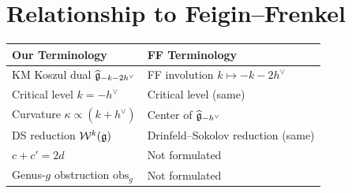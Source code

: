 \section{Relationship to Feigin--Frenkel}

\begin{tabular}{>{\raggedright\arraybackslash}p{}>{\raggedright\arraybackslash}p{}}
\textbf{Our Terminology} & \textbf{FF Terminology} \\
\hline
KM Koszul dual $\widehat{\mathfrak{g}}_{-k-2h^\vee}$ & FF involution $k \mapsto -k - 2h^\vee$ \\
Critical level $k = -h^\vee$ & Critical level (same) \\
Curvature $\kappa \propto (k + h^\vee)$ & Center of $\widehat{\mathfrak{g}}_{-h^\vee}$ \\
DS reduction $\mathcal{W}^k(\mathfrak{g})$ & Drinfeld--Sokolov reduction (same) \\
$c + c' = 2d$ & Not formulated \\
Genus-$g$ obstruction $\mathrm{obs}_g$ & Not formulated \\
\end{tabular}


